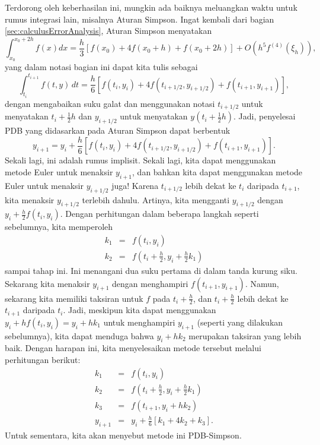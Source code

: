 Terdorong oleh keberhasilan ini, mungkin ada baiknya meluangkan waktu
untuk rumus integrasi lain, misalnya Aturan Simpson. Ingat kembali
dari bagian \ref{sec:calculusErrorAnalysis}, Aturan Simpson menyatakan
\[
{\displaystyle \int_{x_{0}}^{x_{0}+2h}f(x)dx=\frac{h}{3}\left[f(x_{0})+4f(x_{0}+h)+f(x_{0}+2h)\right]+O(h^{5}f^{(4)}(\xi_{h}))},
\]
yang dalam notasi bagian ini dapat kita tulis sebagai
\[
\int_{t_{i}}^{t_{i+1}}f(t,y)\,dt=\frac{h}{6}\left[f(t_{i},y_{i})+4f(t_{i+1/2},y_{i+1/2})+f(t_{i+1},y_{i+1})\right],
\]
dengan mengabaikan suku galat dan menggunakan notasi $t_{i+1/2}$
untuk menyatakan $t_{i}+\frac{1}{2}h$ dan $y_{i+1/2}$ untuk menyatakan
$y(t_{i}+\frac{1}{2}h)$. Jadi, penyelesai PDB yang didasarkan pada
Aturan Simpson dapat berbentuk
\[
y_{i+1}=y_{i}+\frac{h}{6}\left[f(t_{i},y_{i})+4f(t_{i+1/2},y_{i+1/2})+f(t_{i+1},y_{i+1})\right].
\]
Sekali lagi, ini adalah rumus implisit. Sekali lagi, kita dapat menggunakan
metode Euler untuk menaksir $y_{i+1}$, dan bahkan kita dapat menggunakan
metode Euler untuk menaksir $y_{i+1/2}$ juga! Karena $t_{i+1/2}$
lebih dekat ke $t_{i}$ daripada $t_{i+1}$, kita menaksir $y_{i+1/2}$
terlebih dahulu. Artinya, kita mengganti $y_{i+1/2}$ dengan $y_{i}+\frac{h}{2}f(t_{i},y_{i})$.
Dengan perhitungan dalam beberapa langkah seperti sebelumnya, kita
memperoleh
\begin{eqnarray*}
k_{1} & = & f(t_{i},y_{i})\\
k_{2} & = & f\left(t_{i}+\frac{h}{2},y_{i}+\frac{h}{2}k_{1}\right)
\end{eqnarray*}
sampai tahap ini. Ini menangani dua suku pertama di dalam tanda kurung
siku. Sekarang kita menaksir $y_{i+1}$ dengan menghampiri $f(t_{i+1},y_{i+1})$.
Namun, sekarang kita memiliki taksiran untuk $f$ pada $t_{i}+\frac{h}{2}$,
dan $t_{i}+\frac{h}{2}$ lebih dekat ke $t_{i+1}$ daripada $t_{i}$.
Jadi, meskipun kita dapat menggunakan $y_{i}+hf(t_{i},y_{i})=y_{i}+hk_{1}$
untuk menghampiri $y_{i+1}$ (seperti yang dilakukan sebelumnya),
kita dapat menduga bahwa $y_{i}+hk_{2}$ merupakan taksiran yang lebih
baik. Dengan harapan ini, kita menyelesaikan metode tersebut melalui
perhitungan berikut:
\begin{eqnarray*}
k_{1} & = & f(t_{i},y_{i})\\
k_{2} & = & f\left(t_{i}+\frac{h}{2},y_{i}+\frac{h}{2}k_{1}\right)\\
k_{3} & = & f(t_{i+1},y_{i}+hk_{2})\\
y_{i+1} & = & y_{i}+\frac{h}{6}\left[k_{1}+4k_{2}+k_{3}\right].
\end{eqnarray*}
Untuk sementara, kita akan menyebut metode ini PDB-Simpson. 

